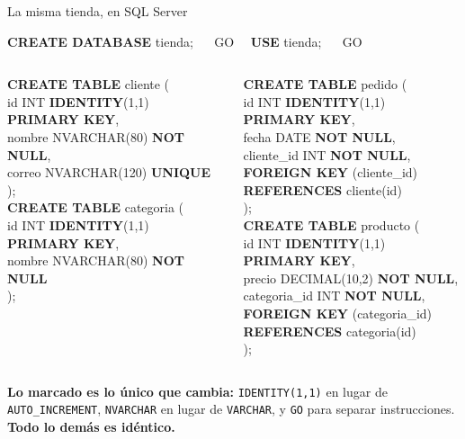 \documentclass[aspectratio=169,10pt,c]{beamer}
\newcommand{\kw}[1]{\textcolor{utpRojo}{\textbf{#1}}}
\newcommand{\nuevo}[1]{{%
  \setlength{\fboxsep}{1.2pt}%
  \begingroup
  \renewcommand{\kw}[1]{\textcolor{utpNegro}{\textbf{##1}}}%
  \colorbox{yellow!45}{\textcolor{utpNegro}{#1}}%
  \endgroup}}
\newenvironment{sqlcode}[1][.86\textwidth]
  {\begin{center}\begin{lrbox}{\sqlbuf}\begin{minipage}{#1}\ttfamily\footnotesize\vspace{6pt}\raggedright}
  {\vspace{6pt}\end{minipage}\end{lrbox}\colorbox{utpGrisClaro}{\usebox{\sqlbuf}}\end{center}}
\newcommand{\ind}{\hspace*{1.6em}}
\begin{document}
\begin{frame}{La misma tienda, en \textnormal{SQL Server}}
\begin{sqlcode}[.97\textwidth]
\scriptsize
\kw{CREATE DATABASE} tienda; \ \ \nuevo{GO} \ \ \kw{USE} tienda; \ \ \nuevo{GO}
\end{sqlcode}
\vspace{-0.25cm}
\begin{columns}[T,onlytextwidth]
\begin{sqlcode}[\textwidth]
\scriptsize
\kw{CREATE TABLE} cliente (\\
\ind id INT \nuevo{\kw{IDENTITY}(1,1)} \kw{PRIMARY KEY},\\
\ind nombre \nuevo{NVARCHAR(80)} \kw{NOT NULL},\\
\ind correo \nuevo{NVARCHAR(120)} \kw{UNIQUE}\\
);\\[7pt]
\kw{CREATE TABLE} categoria (\\
\ind id INT \nuevo{\kw{IDENTITY}(1,1)} \kw{PRIMARY KEY},\\
\ind nombre \nuevo{NVARCHAR(80)} \kw{NOT NULL}\\
);
\end{sqlcode}
\begin{sqlcode}[\textwidth]
\scriptsize
\kw{CREATE TABLE} pedido (\\
\ind id INT \nuevo{\kw{IDENTITY}(1,1)} \kw{PRIMARY KEY},\\
\ind fecha DATE \kw{NOT NULL},\\
\ind cliente\_id INT \kw{NOT NULL},\\
\ind \kw{FOREIGN KEY} (cliente\_id)\\
\ind\ind \kw{REFERENCES} cliente(id)\\
);\\[7pt]
\kw{CREATE TABLE} producto (\\
\ind id INT \nuevo{\kw{IDENTITY}(1,1)} \kw{PRIMARY KEY},\\
\ind precio DECIMAL(10,2) \kw{NOT NULL},\\
\ind categoria\_id INT \kw{NOT NULL},\\
\ind \kw{FOREIGN KEY} (categoria\_id)\\
\ind\ind \kw{REFERENCES} categoria(id)\\
);
\end{sqlcode}
\end{columns}
\vspace{0.15cm}
\small \textbf{Lo marcado es lo único que cambia:} \texttt{IDENTITY(1,1)} en lugar de \texttt{AUTO\_INCREMENT}, \texttt{NVARCHAR} en lugar de \texttt{VARCHAR}, y \texttt{GO} para separar instrucciones. \textbf{Todo lo demás es idéntico.}
\end{frame}
\end{document}
